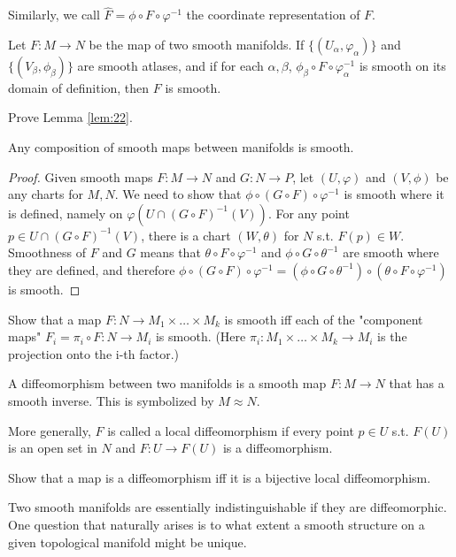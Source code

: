 Similarly, we call $\hat{F}=\phi\circ F\circ\varphi^{-1}$ the coordinate representation of $F$.
\begin{lem}\label{lem:22}
Let $F:M\rightarrow N$ be the map of two smooth manifolds. If $\{(U_\alpha,\varphi_\alpha)\}$ and
$\{(V_\beta,\phi_\beta)\}$ are smooth atlases, and if for each $\alpha,\beta$, $\phi_\beta\circ
F\circ\varphi_{\alpha}^{-1}$ is smooth on its domain of definition, then $F$ is smooth.
\end{lem}
\begin{exer}
Prove Lemma \ref{lem:22}.
\end{exer}
\begin{lem}
Any composition of smooth maps between manifolds is smooth.
\end{lem}
\begin{proof}
Given smooth maps $F:M\rightarrow N$ and $G:N\rightarrow P$, let $(U,\varphi)$ and $(V,\phi)$ be
any charts for $M,N$. We need to show that $\phi\circ(G\circ F)\circ\varphi^{-1}$ is smooth where
it is defined, namely on $\varphi(U\cap (G\circ F)^{-1}(V))$. For any point $p\in U\cap (G\circ F)
^{-1}(V)$, there is a chart $(W,\theta)$ for $N$ s.t. $F(p)\in W$. Smoothness of $F$ and $G$ means
that $\theta\circ F\circ\varphi^{-1}$ and $\phi\circ G\circ\theta^{-1}$ are smooth where they are
defined, and therefore $\phi\circ(G\circ F)\circ\varphi^{-1}=(\phi\circ G\circ\theta^{-1})\circ(
\theta\circ F\circ\varphi^{-1})$ is smooth.
\end{proof}
\begin{exer}
Show that a map $F:N\rightarrow M_1\times\dots \times M_k$ is smooth iff each of the "component maps"
$F_i=\pi_i\circ F:N\rightarrow M_i$ is smooth. (Here $\pi_i:M_1\times\dots \times M_k\rightarrow M_i$
is the projection onto the i-th factor.)
\end{exer}
\begin{definition}
A diffeomorphism between two manifolds is a smooth map $F:M\rightarrow N$ that has a smooth inverse.
This is symbolized by $M\approx N$. 
\end{definition}
More generally, $F$ is called a local diffeomorphism if every point $p\in U$ s.t. $F(U)$ is an open
set in $N$ and $F:U\rightarrow F(U)$ is a diffeomorphism.
\begin{exer}
Show that a map is a diffeomorphism iff it is a bijective local diffeomorphism.
\end{exer}
Two smooth manifolds are essentially indistinguishable if they are diffeomorphic. One question that
naturally arises is to what extent a smooth structure on a given topological manifold might be unique.
